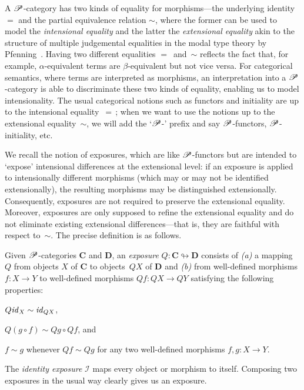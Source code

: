 \documentclass[a4paper,UKenglish,numberwithinsect,cleveref,thm-restate,draft]{lipics-v2021}
\numberwithin{equation}{section}
\theoremstyle{definition}
\theoremstyle{plain}
\begin{document}
A $\mathscr{P}$-category has two kinds of equality for morphisms---the underlying identity $=$ and the partial equivalence relation $\sim$, where the former can be used to model the \emph{intensional equality} and the latter the \emph{extensional equality} akin to the structure of multiple judgemental equalities in the modal type theory by Pfenning~\cite{Pfenning2002a}.
Having two different equalities $=$~and~$\sim$ reflects the fact that, for example, $\alpha$-equivalent terms are $\beta$-equivalent but not vice versa.
For categorical semantics, where terms are interpreted as morphisms, an interpretation into a $\mathscr{P}$-category is able to discriminate these two kinds of equality, enabling us to model intensionality.
The usual categorical notions such as functors and initiality are up to the intensional equality~$=$\,; when we want to use the notions up to the extensional equality~$\sim$, we will add the `$\mathscr{P}$-' prefix and say $\mathscr{P}$-functors, $\mathscr{P}$-initiality, etc.

We recall the notion of exposures, which are like $\mathscr{P}$-functors but are intended to `expose' intensional differences at the extensional level: if an exposure is applied to intensionally different morphisms (which may or may not be identified extensionally), the resulting morphisms may be distinguished extensionally.
Consequently, exposures are not required to preserve the extensional equality.
Moreover, exposures are only supposed to refine the extensional equality and do not eliminate existing extensional differences---that is, they are faithful with respect to~$\sim$.
The precise definition is as follows.

\begin{definition}
  Given $\mathscr{P}$-categories $\mathbf{C}$ and $\mathbf{D}$, an \emph{exposure} $Q\colon \mathbf{C} \looparrowright \mathbf{D}$ consists of \emph{(a)} a mapping $Q$ from objects $X$ of\/ $\mathbf{C}$ to objects~$QX$ of\/ $\mathbf{D}$ and \emph{(b)} from well-defined morphisms $f\colon X \to Y$ to well-defined morphisms $Qf\colon QX \to QY$ satisfying the following properties:
  \begin{romanenumerate}
    \item $Q\mathit{id}_X \sim \mathit{id}_{QX}$,
    \item $Q(g \circ f) \sim Qg \circ Qf$, and
    \item $f \sim g$ whenever $Qf \sim Qg$ for any two well-defined morphisms $f, g\colon X \to Y$. 
  \end{romanenumerate}
\end{definition}
The \emph{identity exposure} $\mathcal{I}$ maps every object or morphism to itself.
Composing two exposures in the usual way clearly gives us an exposure. 
\end{document}
